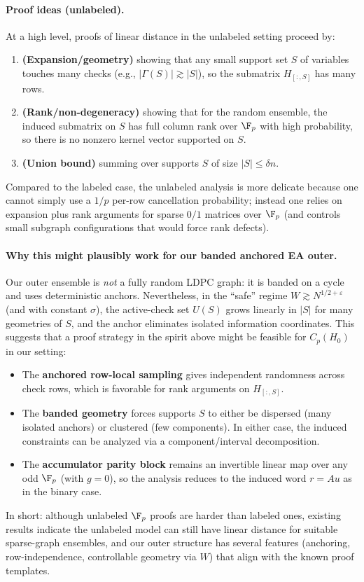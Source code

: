 \paragraph{Proof ideas (unlabeled).}
At a high level, proofs of linear distance in the unlabeled setting proceed by:
\begin{enumerate}
\item \textbf{(Expansion/geometry)} showing that any small support set $S$ of variables touches many checks
      (e.g., $|\Gamma(S)|\gtrsim |S|$), so the submatrix $H_{[:,S]}$ has many rows.
\item \textbf{(Rank/non-degeneracy)} showing that for the random ensemble, the induced submatrix on $S$ has full column
      rank over $\F_p$ with high probability, so there is no nonzero kernel vector supported on $S$.
\item \textbf{(Union bound)} summing over supports $S$ of size $|S|\le \delta n$.
\end{enumerate}
Compared to the labeled case, the unlabeled analysis is more delicate because one cannot simply use a $1/p$ per-row
cancellation probability; instead one relies on expansion plus rank arguments for sparse $0/1$ matrices over $\F_p$ (and
controls small subgraph configurations that would force rank defects).

\paragraph{Why this might plausibly work for our banded anchored EA outer.}
Our outer ensemble is \emph{not} a fully random LDPC graph: it is banded on a cycle and uses deterministic anchors.
Nevertheless, in the ``safe'' regime $W\gtrsim N^{1/2+\varepsilon}$ (and with constant $\sigma$), the active-check set
$U(S)$ grows linearly in $|S|$ for many geometries of $S$, and the anchor eliminates isolated information coordinates.
This suggests that a proof strategy in the spirit above might be feasible for $C_p(H_0)$ in our setting:
\begin{itemize}
\item The \textbf{anchored row-local sampling} gives independent randomness across check rows, which is favorable for
      rank arguments on $H_{[:,S]}$.
\item The \textbf{banded geometry} forces supports $S$ to either be dispersed (many isolated anchors) or clustered
      (few components). In either case, the induced constraints can be analyzed via a component/interval decomposition.
\item The \textbf{accumulator parity block} remains an invertible linear map over any odd $\F_p$ (with $g=0$), so the
      analysis reduces to the induced word $r=Au$ as in the binary case.
\end{itemize}
In short: although unlabeled $\F_p$ proofs are harder than labeled ones, existing results indicate the unlabeled model can
still have linear distance for suitable sparse-graph ensembles, and our outer structure has several features (anchoring,
row-independence, controllable geometry via $W$) that align with the known proof templates. \cite{ComoThesis} \cite{ComoThesis2}

